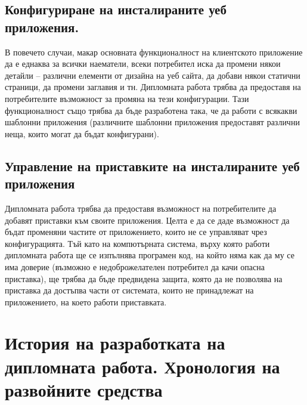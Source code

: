 \documentclass[pdftex,14pt,a4paper]{extreport}
\begin{document}
\subsection {Конфигуриране на инсталираните уеб приложения.}
В повечето случаи, макар основната функционалност на клиентското приложение да е еднаква за всички наематели, всеки потребител иска да промени някои детайли – различни елементи от дизайна на уеб сайта, да добави някои статични страници, да промени заглавия и тн. Дипломната работа трябва да предоставя на потребителите възможност за промяна на тези конфигурации. Тази функционалност също трябва да бъде разработена така, че да работи с всякакви шаблонни приложения (различните шаблонни приложения предоставят различни неща, които могат да бъдат конфигурани).
\subsection {Управление на приставките на инсталираните уеб приложения}
Дипломната работа трябва да предоставя възможност на потребителите да добавят приставки към своите приложения. Целта е да се даде възможност да бъдат променяни частите от приложението, които не се управляват чрез конфигурацията. Тъй като на компютърната система, върху която работи дипломната работа ще се изпълнява програмен код, на който няма как да му се има доверие (възможно е недоброжелателен потребител да качи опасна приставка), ще трябва да бъде предвидена защита, която да не позволява на приставка да достъпва части от системата, които не принадлежат на приложението, на което работи приставката.
\section {История на разработката на дипломната работа. Хронология на развойните средства}
\end{document}
